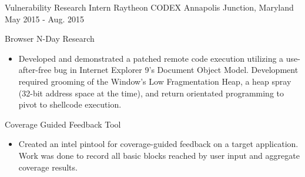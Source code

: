 \begin{cventries}
  \cventry
    {Vulnerability Research Intern} %
    {Raytheon CODEX} %
    {Annapolis Junction, Maryland} %
    {May 2015 - Aug. 2015} %
    {
      \begin{cvitems} %
        \item {Browser N-Day Research}
        \begin{itemize}
          \item {Developed and demonstrated a patched remote code execution utilizing a use-after-free bug in Internet Explorer 9's Document Object Model. Development required grooming of the Window's Low Fragmentation Heap, a heap spray (32-bit address space at the time), and return orientated programming to pivot to shellcode execution.}
        \end{itemize}
        \item {Coverage Guided Feedback Tool}
        \begin{itemize}
          \item {Created an intel pintool for coverage-guided feedback on a target application. Work was done to record all basic blocks reached by user input and aggregate coverage results.}
        \end{itemize}
      \end{cvitems}
    }

\end{cventries}
